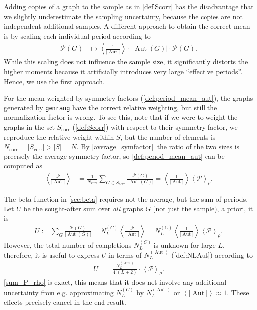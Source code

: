 \documentclass[12pt,a4paper]{article}
\newcommand{\abs}[1]{\lvert #1 \rvert}
\newcommand{\period}{\mathcal P}
\newcommand{\Aut}{\operatorname{Aut}}
\renewcommand{\|}{\rule[-0.4ex]{0.2ex}{1.2em}}
\begin{document}
Adding copies of a graph to the sample as in \cref{def:Scorr} has the disadvantage that we slightly underestimate the sampling uncertainty, because the copies are not independent additional samples. 
A different approach to obtain the correct mean is   by scaling each individual period according to
\begin{align}\label{period_sampling_rescaling}
	\period(G)&\mapsto\left \langle \frac{1}{\abs{\Aut}} \right \rangle \cdot  \abs{\Aut(G)} \cdot \period (G) . 
\end{align}
While this scaling does not influence the sample size, it significantly distorts the higher moments  because it artificially introduces very large \enquote{effective periods}. Hence, we use the first approach.

For the mean weighted by symmetry factors (\cref{def:period_mean_aut}), the graphs generated by \texttt{genrang} have the correct relative weighting, but still the normalization factor is wrong. To see this, note that if we were to weight the graphs in the set  $S_\text{corr}$ (\cref{def:Scorr}) with respect to their symmetry factor, we reproduce  the relative weight within $S$, but the number of elements is $N_\text{corr}=\abs{S_\text{corr}}>\abs{S}=N$. By \cref{average_symfactor}, the ratio of the two sizes is precisely the average symmetry factor, so   \cref{def:period_mean_aut} can be computed as
\begin{align*}
\left \langle \frac{\period}{\abs{\Aut}} \right \rangle &= \frac{1}{N_\text{corr}}\sum_{G\in S_\text{corr}} \frac{\period(G)}{\abs{\Aut(G)}} = \left \langle \frac{1}{\abs{\Aut}} \right \rangle  \left \langle \period \right \rangle _\rho.
\end{align*}


The beta function in \cref{sec:beta} requires not the average, but the sum of periods. Let $U$ be the sought-after sum over \emph{all} graphs $G$ (not just the sample), a priori, it is 
\begin{align*}
U :=\sum_G \frac{\period(G)}{\abs{\Aut(G)}} = N^{(C)}_L \left \langle \frac{\period}{\abs{\Aut}} \right \rangle  =  N^{(C)}_L\left \langle \frac{1}{\abs{\Aut}} \right \rangle \left \langle \period \right \rangle _\rho.
\end{align*}
However, the total number of completions $N^{(C)}_L$ is unknown for large $L$, therefore, it is useful to express $U$ in terms of $N^{(\Aut)}_L$ (\cref{def:NLAut}) according to 
\begin{align}\label{sum_P_rho}
U &=  \frac{N^{(\Aut)}_L}{4!(L+2)} \cdot \left \langle \period \right \rangle _\rho. 
\end{align}
\cref{sum_P_rho} is exact, this means that it does not involve any additional uncertainty from e.g. approximating $N^{(C)}_L$ by $N^{(\Aut)}_L$ or $\left \langle \abs{\Aut} \right \rangle \approx 1$. These effects precisely cancel in the end result. 
\end{document}
